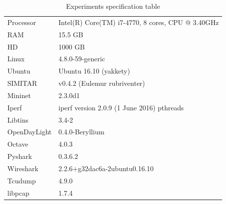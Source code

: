 \begin{table}[ht!]
	\centering
	\caption{Experiments specification table}
	\label{tab:specifications}
	\begin{tabular}{ll}
		\hline
		Processor            & Intel(R) Core(TM) i7-4770, 8 cores, CPU @ 3.40GHz \\
		RAM                  & 15.5 GB                                           \\
		HD                   & 1000 GB                                           \\
		Linux         & 4.8.0-59-generic                                  \\
		Ubuntu        & Ubuntu 16.10 (yakkety)                            \\
		SIMITAR       & v0.4.2 (Eulemur rubriventer)                      \\
		Mininet       & 2.3.0d1                                           \\
		Iperf         & iperf version 2.0.9 (1 June 2016) pthreads        \\
		Libtins       & 3.4-2                                             \\
		OpenDayLight  & 0.4.0-Beryllium                                   \\
		Octave        & 4.0.3                                             \\
		Pyshark       & 0.3.6.2                                     \\
		Wireshark     & 2.2.6+g32dac6a-2ubuntu0.16.10               \\
		Tcudump       & 4.9.0 \\
		libpcap       & 1.7.4\\
		\hline
	\end{tabular}
\end{table}



